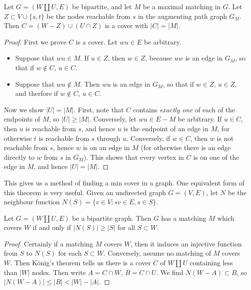 \begin{theorem}
    Let $G = (W \amalg U, E)$ be bipartite, and let $M$ be a maximal matching in $G$. Let $Z \subset V \cup \{ s, t \}$ be the nodes reachable from $s$ in the augmenting path graph $G_M$. Then $C = (W - Z) \cup (U \cap Z)$ is a cover with $|C| = |M|$.
\end{theorem}
\begin{proof}
    First we prove $C$ is a cover. Let $wu \in E$ be arbitrary.
    \begin{itemize}
        \item Suppose that $wu \in M$. If $u \in Z$, then $w \in Z$, because $uw$ is an edge in $G_M$, so that if $w \not \in C$, $u \in C$. \item Suppose that $wu \not \in M$. Then $wu$ is an edge in $G_M$, so that if $w \in Z$, $u \in Z$, and therfore if $w \not \in C$, $u \in C$.
    \end{itemize}
    Now we show $|U| = |M|$. First, note that $C$ contains {\it exactly one} of each of the endpoints of $M$, so $|U| \geq |M|$. Conversely, let $wu \in E - M$ be arbitrary. If $u \in C$, then $u$ is reachable from $s$, and hence $u$ is the endpoint of an edge in $M$, for otherwise $t$ is reachable from $s$ through $u$. Conversely, if $w \in C$, then $w$ is not reachable from $s$, hence $w$ is on an edge in $M$ (for otherwise there is an edge directly to $w$ from $s$ in $G_M$). This shows that every vertex in $C$ is on one of the edge in $M$, and hence $|U| = |M|$.
\end{proof}

This gives us a method of finding a min cover in a graph. One equivalent form of this theorem is very useful. Given an undirected graph $G = (V,E)$, let $N$ be the neighbour function $N(S) = \{ v \in V : sv \in E, s \in S \}$.

\begin{theorem}[Hall]
    Let $G = (W \amalg U, E)$ be a bipartite graph. Then $G$ has a matching $M$ which covers $W$ if and only if $|N(S)| \geq |S|$ for all $S \subset W$.
\end{theorem}
\begin{proof}
    Certainly if a matching $M$ covers $W$, then it induces an injective function from $S$ to $N(S)$ for each $S \subset W$. Conversely, assume no matching of $M$ covers $W$. Then K\"{o}nig's theorem tells us there is a cover $C$ of $W \amalg U$ containing less than $|W|$ nodes. Then write $A = C \cap W$, $B = C \cap U$. We find $N(W - A) \subset B$, so $|N(W-A)| \leq |B| < |W| - |A|$.
\end{proof}

